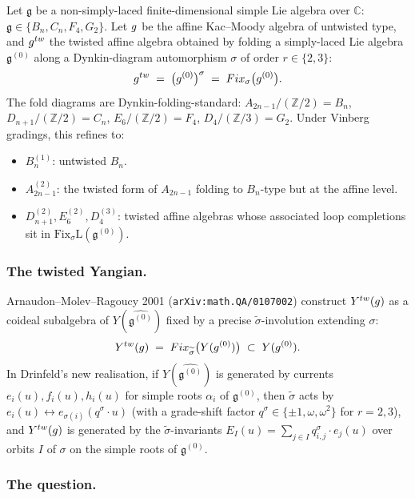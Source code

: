 \documentclass[11pt]{article}
\newcommand{\C}{\mathbb{C}}
\newcommand{\Z}{\mathbb{Z}}
\newcommand{\frakg}{\mathfrak{g}}
\begin{document}
Let $\frakg$ be a non-simply-laced finite-dimensional simple Lie
algebra over $\C$: $\frakg \in \{B_n, C_n, F_4, G_2\}$. Let
$\widehat\frakg$ be the affine Kac--Moody algebra of untwisted type,
and $\widehat\frakg^{\mathrm{tw}}$ the twisted affine algebra obtained
by folding a simply-laced Lie algebra $\frakg^{(0)}$ along a
Dynkin-diagram automorphism $\sigma$ of order $r \in \{2, 3\}$:
\[
  \widehat\frakg^{\mathrm{tw}} \;=\;
  \bigl(\widehat{\frakg^{(0)}}\bigr)^{\sigma}
  \;=\;
  \mathrm{Fix}_{\sigma}\bigl(\widehat{\frakg^{(0)}}\bigr).
\]
The fold diagrams are Dynkin-folding-standard:
$A_{2n-1}/(\Z/2) = B_n$, $D_{n+1}/(\Z/2) = C_n$, $E_6/(\Z/2) = F_4$,
$D_4/(\Z/3) = G_2$. Under Vinberg gradings, this refines to:
\begin{itemize}
\item $B_n^{(1)}$: untwisted $B_n$.
\item $A_{2n-1}^{(2)}$: the twisted form of $A_{2n-1}$ folding to
  $B_n$-type but at the affine level.
\item $D_{n+1}^{(2)}, E_6^{(2)}, D_4^{(3)}$: twisted affine algebras
  whose associated loop completions sit in $\mathrm{Fix}_{\sigma}
  \mathrm{L}(\frakg^{(0)})$.
\end{itemize}

\subsubsection*{The twisted Yangian.}
Arnaudon--Molev--Ragoucy 2001 (\texttt{arXiv:math.QA/0107002}) construct
$Y^{\mathrm{tw}}(\widehat\frakg)$ as a coideal subalgebra of
$Y(\widehat{\frakg^{(0)}})$ fixed by a precise
$\widetilde\sigma$-involution extending $\sigma$:
\[
  Y^{\mathrm{tw}}(\widehat\frakg) \;=\;
  \mathrm{Fix}_{\widetilde\sigma}\bigl(Y(\widehat{\frakg^{(0)}})\bigr)
  \;\subset\; Y(\widehat{\frakg^{(0)}}).
\]
In Drinfeld's new realisation, if $Y(\widehat{\frakg^{(0)}})$ is
generated by currents $e_i(u), f_i(u), h_i(u)$ for simple roots
$\alpha_i$ of $\frakg^{(0)}$, then $\widetilde\sigma$ acts by
$e_i(u) \leftrightarrow e_{\sigma(i)}(q^\sigma \cdot u)$ (with a
grade-shift factor $q^\sigma \in \{\pm 1, \omega, \omega^2\}$ for
$r = 2, 3$), and $Y^{\mathrm{tw}}(\widehat\frakg)$ is generated by
the $\widetilde\sigma$-invariants
$E_I(u) = \sum_{j \in I} q^\sigma_{i, j} \cdot e_j(u)$ over orbits
$I$ of $\sigma$ on the simple roots of $\frakg^{(0)}$.

\subsubsection*{The question.}
\end{document}
